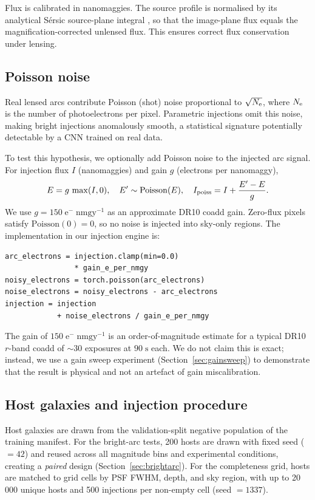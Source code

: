 \documentclass[fleqn,usenatbib]{rasti}
\begin{document}
Flux is calibrated in nanomaggies.  The source profile is normalised by its analytical S\'{e}rsic source-plane integral \citep{GrahamDriver2005}, so that the image-plane flux equals the magnification-corrected unlensed flux.  This ensures correct flux conservation under lensing.

\subsection{Poisson noise}

Real lensed arcs contribute Poisson (shot) noise proportional to $\sqrt{N_{\rm e}}$, where $N_{\rm e}$ is the number of photoelectrons per pixel.  Parametric injections omit this noise, making bright injections anomalously smooth, a statistical signature potentially detectable by a CNN trained on real data.

To test this hypothesis, we optionally add Poisson noise to the injected arc signal.  For injection flux $I$ (nanomaggies) and gain $g$ (electrons per nanomaggy),
\begin{equation}
E = g\,\max(I, 0), \quad E' \sim \mathrm{Poisson}(E), \quad I_{\rm poiss} = I + \frac{E' - E}{g} .
\label{eq:poisson}
\end{equation}
We use $g = 150\;\mathrm{e^{-}\;nmgy^{-1}}$ as an approximate DR10 coadd gain.  Zero-flux pixels satisfy $\mathrm{Poisson}(0) = 0$, so no noise is injected into sky-only regions.  The implementation in our injection engine is:
\begin{verbatim}
arc_electrons = injection.clamp(min=0.0)
                * gain_e_per_nmgy
noisy_electrons = torch.poisson(arc_electrons)
noise_electrons = noisy_electrons - arc_electrons
injection = injection
            + noise_electrons / gain_e_per_nmgy
\end{verbatim}

The gain of $150\;\mathrm{e^{-}\;nmgy^{-1}}$ is an order-of-magnitude estimate for a typical DR10 $r$-band coadd of $\sim\!30$ exposures at $90\;\mathrm{s}$ each.  We do not claim this is exact; instead, we use a gain sweep experiment (Section~\ref{sec:gainsweep}) to demonstrate that the result is physical and not an artefact of gain miscalibration.

\subsection{Host galaxies and injection procedure}

Host galaxies are drawn from the validation-split negative population of the training manifest.  For the bright-arc tests, 200 hosts are drawn with fixed seed ($= 42$) and reused across all magnitude bins and experimental conditions, creating a \emph{paired} design (Section~\ref{sec:brightarc}).  For the completeness grid, hosts are matched to grid cells by PSF FWHM, depth, and sky region, with up to 20\,000 unique hosts and 500 injections per non-empty cell (seed $= 1337$).
\end{document}
